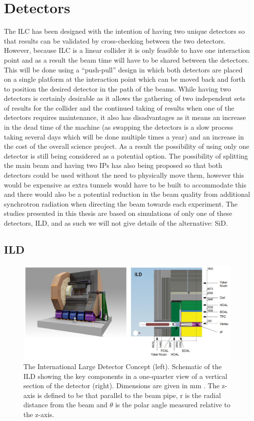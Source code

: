 \section{Detectors}
The \ac{ILC} has been designed with the intention of having two unique detectors so that results can be validated by cross-checking between the two detectors. However, because \ac{ILC} is a linear collider it is only feasible to have one interaction point and as a result the beam time will have to be shared between the detectors. This will be done using a ``push-pull'' design in which both detectors are placed on a single platform at the interaction point which can be moved back and forth to position the desired detector in the path of the beams. While having two detectors is certainly desirable as it allows the gathering of two independent sets of results for the collider and the continued taking of results when one of the detectors requires maintenance, it also has disadvantages as it means an increase in the dead time of the machine (as swapping the detectors is a slow process taking several days which will be done multiple times a year) and an increase in the cost of the overall science project. As a result the possibility of using only one detector is still being considered as a potential option. The possibility of splitting the main beam and having two IPs has also being proposed so that both detectors could be used without the need to physically move them, however this would be expensive as extra tunnels would have to be built to accommodate this and there would also be a potential reduction in the beam quality from additional synchrotron radiation when directing the beam towards each experiment. The studies presented in this thesis are based on simulations of only one of these detectors, \ac{ILD}\cite{ILD}, and as such we will not give details of the alternative: \ac{SiD}\cite{Aihara:2009ad}. 

\subsection{ILD}
\begin{figure}
  \centering
  \includegraphics[width=1.0\textwidth,keepaspectratio]{Experiments/fig/ILD}
  \caption[ILD Detector]{The International Large Detector Concept (left). Schematic of the ILD showing the key components in a one-quarter view of a vertical section of the detector (right). Dimensions are given in mm \cite{ILCTDR}. The z-axis is defined to be that parallel to the beam pipe, r is the radial distance from the beam and $\theta$ is the polar angle measured relative to the z-axis.}
  \label{Fig:ILD}
\end{figure}

